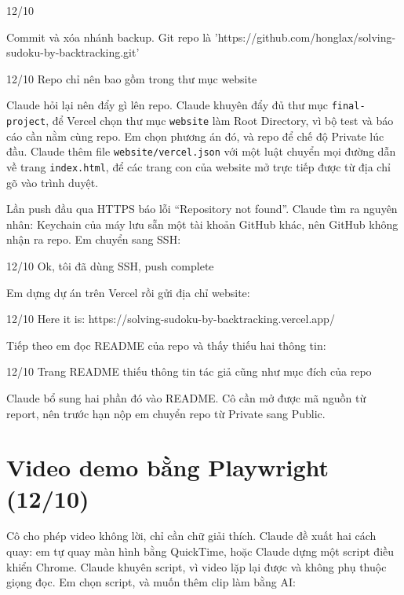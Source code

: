 \begin{promptbox}{12/10}
\raggedright
Commit và xóa nhánh backup. Git repo là 'https://github.com/honglax/solving-sudoku-by-backtracking.git'
\end{promptbox}

\begin{promptbox}{12/10}
Repo chỉ nên bao gồm trong thư mục website
\end{promptbox}

Claude hỏi lại nên đẩy gì lên repo. Claude khuyên đẩy đủ thư mục \texttt{final-project}, để Vercel chọn thư mục \texttt{website} làm Root Directory, vì bộ test và báo cáo cần nằm cùng repo. Em chọn phương án đó, và repo để chế độ Private lúc đầu. Claude thêm file \texttt{website/vercel.json} với một luật chuyển mọi đường dẫn về trang \texttt{index.html}, để các trang con của website mở trực tiếp được từ địa chỉ gõ vào trình duyệt.

Lần push đầu qua HTTPS báo lỗi ``Repository not found''. Claude tìm ra nguyên nhân: Keychain của máy lưu sẵn một tài khoản GitHub khác, nên GitHub không nhận ra repo. Em chuyển sang SSH:

\begin{promptbox}{12/10}
Ok, tôi đã dùng SSH, push complete
\end{promptbox}

Em dựng dự án trên Vercel rồi gửi địa chỉ website:

\begin{promptbox}{12/10}
Here it is: https://solving-sudoku-by-backtracking.vercel.app/
\end{promptbox}

Tiếp theo em đọc README của repo và thấy thiếu hai thông tin:

\begin{promptbox}{12/10}
Trang README thiếu thông tin tác giả cũng như mục đích của repo
\end{promptbox}

Claude bổ sung hai phần đó vào README. Cô cần mở được mã nguồn từ report, nên trước hạn nộp em chuyển repo từ Private sang Public.

\section{Video demo bằng Playwright (12/10)}
\label{sec:demo-video}

Cô cho phép video không lời, chỉ cần chữ giải thích. Claude đề xuất hai cách quay: em tự quay màn hình bằng QuickTime, hoặc Claude dựng một script điều khiển Chrome. Claude khuyên script, vì video lặp lại được và không phụ thuộc giọng đọc. Em chọn script, và muốn thêm clip làm bằng AI:


